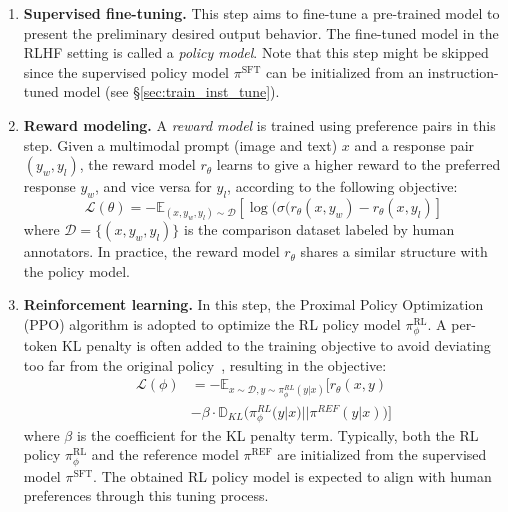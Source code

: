 \begin{enumerate}[leftmargin=*]
    \item \textbf{Supervised fine-tuning.} This step aims to fine-tune a pre-trained model to present the preliminary desired output behavior. The fine-tuned model in the RLHF setting is called a \textit{policy model}. Note that this step might be skipped since the supervised policy model $\pi^{\text{SFT}}$ can be initialized from an instruction-tuned model (see \S \ref{sec:train_inst_tune}). 
    \item \textbf{Reward modeling.} A \textit{reward model} is trained using preference pairs in this step. Given a multimodal prompt (\eg image and text) $x$ and a response pair $(y_w, y_l)$, the reward model $r_\theta$ learns to give a higher reward to the preferred response $y_w$, and vice versa for $y_l$, according to the following objective:
    \begin{equation}
        \mathcal{L}(\theta)=-\mathbb{E}_{(x,y_w,y_l)\sim \mathcal{D}} \left[ \log (\sigma(r_\theta (x, y_w) - r_\theta(x, y_l) \right]
    \end{equation}
    where $\mathcal{D}=\{(x,y_w,y_l)\}$ is the comparison dataset labeled by human annotators. In practice, the reward model $r_\theta$ shares a similar structure with the policy model.
    \item \textbf{Reinforcement learning.} In this step, the Proximal Policy Optimization (PPO) algorithm is adopted to optimize the RL policy model $\pi^{\text{RL}}_\phi$. A per-token KL penalty is often added to the training objective to avoid deviating too far from the original policy~\cite{ouyang2022training}, resulting in the objective:
     \begin{equation}
     \begin{split}
        \mathcal{L}(\phi) &= -\mathbb{E}_{x\sim \mathcal{D}, y\sim \pi^{RL}_{\phi}(y|x)} \Big[ r_\theta(x,y)  \\
        &- \beta\cdot \mathbb{D}_{KL}\Big(\pi^{RL}_{\phi}(y|x) || \pi^{REF}(y|x)\Big) \Big]
    \end{split}
    \end{equation}
    where $\beta$ is the coefficient for the KL penalty term. Typically, both the RL policy $\pi^{\text{RL}}_\phi$ and the reference model $\pi^{\text{REF}}$ are initialized from the supervised model $\pi^{\text{SFT}}$. The obtained RL policy model is expected to align with human preferences through this tuning process.    
\end{enumerate}

